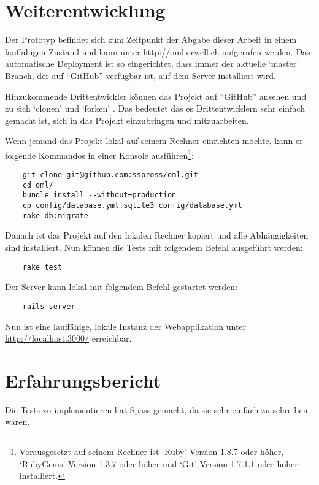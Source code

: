 \section{Weiterentwicklung}
Der Prototyp befindet sich zum Zeitpunkt der Abgabe dieser Arbeit in einem
lauffähigen Zustand und kann unter \url{http://oml.orwell.ch} aufgerufen werden. 
Das automatische Deployment ist so eingerichtet, dass immer der aktuelle `master' 
Branch, der auf ``GitHub'' verfügbar ist, auf dem Server installiert wird.

Hinzukommende Drittentwickler können das Projekt auf ``GitHub'' ansehen und
zu sich `clonen' \cite{clone} und `forken' \cite{fork}. Das bedeutet das es
Drittentwicklern sehr einfach gemacht ist, sich in das Projekt einzubringen
und mitzuarbeiten.

Wenn jemand das Projekt lokal auf seinem Rechner einrichten möchte, kann er
folgende Kommandos in einer Konsole ausführen\footnote{Vorausgesetzt auf seinem
Rechner ist `Ruby' Version 1.8.7 oder höher, `RubyGems' Version 1.3.7 oder 
höher und `Git' Version 1.7.1.1 oder höher installiert.}:

\begin{verbatim}
    git clone git@github.com:sspross/oml.git
    cd oml/
    bundle install --without=production
    cp config/database.yml.sqlite3 config/database.yml
    rake db:migrate
\end{verbatim}

Danach ist das Projekt auf den lokalen Rechner kopiert und alle Abhängigkeiten
sind installiert. Nun können die Tests mit folgendem Befehl ausgeführt werden:

\begin{verbatim}
    rake test
\end{verbatim}

Der Server kann lokal mit folgendem Befehl gestartet werden:

\begin{verbatim}
    rails server
\end{verbatim}

Nun ist eine lauffähige, lokale Instanz der Webapplikation unter 
\url{http://localhost:3000/} erreichbar.  

\section{Erfahrungsbericht}
Die Tests zu implementieren hat Spass gemacht, da sie sehr einfach zu schreiben
waren.